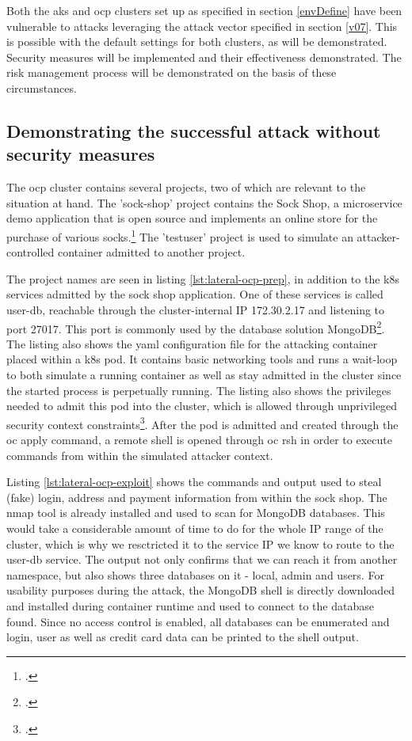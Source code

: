 Both the \gls{aks} and \gls{ocp} clusters set up as specified in section \ref{envDefine} have been vulnerable to attacks leveraging the attack vector specified in section \ref{v07}. This is possible with the default settings for both clusters, as will be demonstrated. Security measures will be implemented and their effectiveness demonstrated. The risk management process will be demonstrated on the basis of these circumstances.

\subsection{Demonstrating the successful attack without security measures}
The \gls{ocp} cluster contains several projects, two of which are relevant to the situation at hand. 
The 'sock-shop' project contains the Sock Shop, a microservice demo application that is open source and implements an online store for the purchase of various socks.\footcite[][, first paragraph of 'README.md']{sockShop}
The 'testuser' project is used to simulate an attacker-controlled container admitted to another project.

The project names are seen in listing \ref{lst:lateral-ocp-prep}, in addition to the \gls{k8s} services admitted by the sock shop application. One of these services is called user-db, reachable through the cluster-internal IP 172.30.2.17 and listening to port 27017. This port is commonly used by the database solution MongoDB\footcite[][, first table row]{mongoPort}. The listing also shows the yaml configuration file for the attacking container placed within a \gls{k8s} pod. It contains basic networking tools and runs a wait-loop to both simulate a running container as well as stay admitted in the cluster since the started process is perpetually running. The listing also shows the privileges needed to admit this pod into the cluster, which is allowed through unprivileged security context constraints\footcite[][, refer to table of section 'Listing Security Context Constraints']{sccDefaults}. After the pod is admitted and created through the oc apply command, a remote shell is opened through oc rsh in order to execute commands from within the simulated attacker context.

Listing \ref{lst:lateral-ocp-exploit} shows the commands and output used to steal (fake) login, address and payment information from within the sock shop.
The nmap tool is already installed and used to scan for MongoDB databases. This would take a considerable amount of time to do for the whole IP range of the cluster, which is why we resctricted it to the service IP we know to route to the user-db service. The output not only confirms that we can reach it from another namespace, but also shows three databases on it - local, admin and users.
For usability purposes during the attack, the MongoDB shell is directly downloaded and installed during container runtime and used to connect to the database found. Since no access control is enabled, all databases can be enumerated and login, user as well as credit card data can be printed to the shell output.

